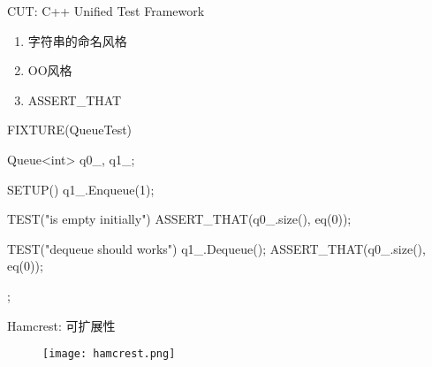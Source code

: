 \begin{frame}[fragile]{CUT: C++ Unified Test Framework}
\begin{enumerate}
  \item 字符串的命名风格
  \item OO风格
  \item ASSERT\_THAT
\end{enumerate}

  \begin{c++}
FIXTURE(QueueTest) {
  Queue<int> q0_, q1_;

  SETUP() {
    q1_.Enqueue(1);
  }

  TEST("is empty initially") {
    ASSERT_THAT(q0_.size(), eq(0));
  }

  TEST("dequeue should works") {
    q1_.Dequeue();
    ASSERT_THAT(q0_.size(), eq(0));
  }
};
\end{c++}
\end{frame}

\begin{frame}[fragile]{Hamcrest: 可扩展性}
  \begin{figure}
    \centering
    \texttt{[image: hamcrest.png]}
  \end{figure}
\end{frame}

